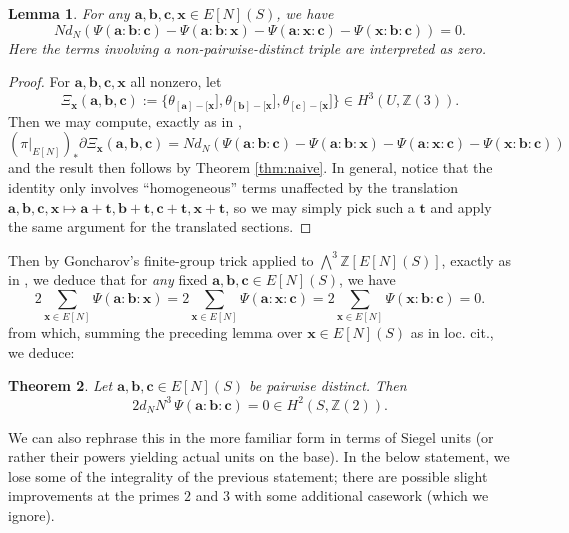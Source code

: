 \documentclass[a4paper,reqno,11pt]{amsart}
\theoremstyle{plain}
\newtheorem{theorem}{Theorem}[section]
\newtheorem{lemma}[theorem]{Lemma}
\theoremstyle{definition}
\theoremstyle{remark}
\newcommand{\Z}{\mathbb{Z}}
\begin{document}
\begin{lemma} \label{lem:321}
For any
$\mathbf a,\mathbf b,\mathbf c,\mathbf x\in E[N](S)$, we have
\[
Nd_N
(
\Psi(\mathbf a:\mathbf b:\mathbf c)
-\Psi(\mathbf a:\mathbf b:\mathbf x)
-\Psi(\mathbf a:\mathbf x:\mathbf c)
-\Psi(\mathbf x:\mathbf b:\mathbf c))
=0.
\]
Here the terms involving a non-pairwise-distinct triple are interpreted as zero.
\end{lemma}
\begin{proof}
    For
    $\mathbf{a},\mathbf{b},\mathbf{c},\mathbf{x}$ all nonzero, let
    \[
    \Xi_{\mathbf{x}}(\mathbf{a},\mathbf{b},\mathbf{c})
    :=
    \{\theta_{[\mathbf{a}]-[\mathbf{x}}],
      \theta_{[\mathbf{b}]-[\mathbf{x}}],
      \theta_{[\mathbf{c}]-[\mathbf{x}}]\}
    \in H^3(U,\Z(3)).
    \]
    Then we may compute, exactly as in \cite[Lemma 3.2.1]{BPPS},
    \[
    (\pi|_{E[N]})_*
    \partial\Xi_{\mathbf{x}}(\mathbf{a},\mathbf{b},\mathbf{c})
    =
    Nd_N(
     \Psi(\mathbf{a}:\mathbf{b}:\mathbf{c})
    -\Psi(\mathbf{a}:\mathbf{b}:\mathbf{x})
    -\Psi(\mathbf{a}:\mathbf{x}:\mathbf{c})
    -\Psi(\mathbf{x}:\mathbf{b}:\mathbf{c})
    )
    \]
    and the result then follows by Theorem \ref{thm:naive}. In general, notice that the identity only involves ``homogeneous'' terms unaffected by the translation $\mathbf{a},\mathbf{b},\mathbf{c},\mathbf{x}\mapsto \mathbf{a}+\mathbf{t},\mathbf{b}+\mathbf{t},\mathbf{c}+\mathbf{t},\mathbf{x}+\mathbf{t}$, so we may simply pick such a $\mathbf{t}$ and apply the same argument for the translated sections.
\end{proof}

Then by Goncharov's finite-group trick applied to $\bigwedge^3 \Z[E[N](S)]$, exactly as in \cite[Proposition 3.2.3]{BPPS}, we deduce that for \emph{any} fixed $\mathbf{a},\mathbf{b},\mathbf{c}\in E[N](S)$, we have
\[
2\sum_{\mathbf{x}\in E[N]}\Psi(\mathbf{a}:\mathbf{b}:\mathbf{x})
=
2\sum_{\mathbf{x}\in E[N]}\Psi(\mathbf{a}:\mathbf{x}:\mathbf{c})
=
2\sum_{\mathbf{x}\in E[N]}\Psi(\mathbf{x}:\mathbf{b}:\mathbf{c})
=0.
\]
from which, summing the preceding lemma over $\mathbf{x}\in E[N](S)$ as in loc. cit., we deduce:
\begin{theorem} \label{thm:bpps}
Let $\mathbf{a},\mathbf{b},\mathbf{c}\in E[N](S)$ be pairwise distinct. Then
\[
2d_N N^3\,
\Psi(\mathbf{a}:\mathbf{b}:\mathbf{c})=0\in H^2(S,\Z(2)).
\]
\end{theorem}

We can also rephrase this in the more familiar form in terms of Siegel units (or rather their powers yielding actual units on the base). In the below statement, we lose some of the integrality of the previous statement; there are possible slight improvements at the primes $2$ and $3$ with some additional casework (which we ignore).
\end{document}
